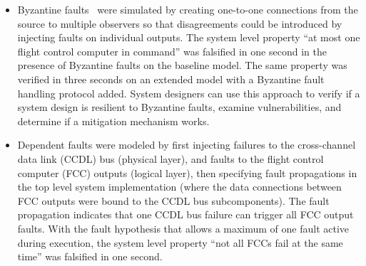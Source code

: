 \begin{itemize}
	\item Byzantine faults~\cite{Driscoll-Byzantine-Fault} were simulated by creating one-to-one connections from the source to multiple observers so that disagreements could be introduced by injecting faults on individual outputs. The system level property ``at most one flight control computer in command'' was falsified in one second in the presence of Byzantine faults on the baseline model. The same property was verified in three seconds on an extended model with a Byzantine fault handling protocol added.  System designers can use this approach to verify if a system design is resilient to Byzantine faults, examine vulnerabilities, and determine if a mitigation mechanism works.
	
	\item Dependent faults were modeled by first injecting failures to the cross-channel data link (CCDL) bus (physical layer), and faults to the flight control computer (FCC) outputs (logical layer), then specifying fault propagations in the top level system implementation (where the data connections between FCC outputs were bound to the CCDL bus subcomponents). The fault propagation indicates that one CCDL bus failure can trigger all FCC output faults. With the fault hypothesis that allows a maximum of one fault active during execution, the system level property ``not all FCCs fail at the same time'' was falsified in one second.
	
	
\end{itemize}

